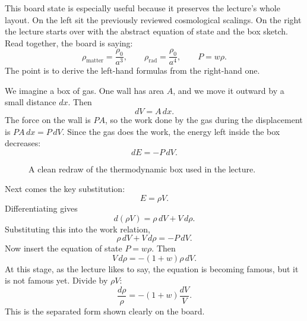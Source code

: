 This board state is especially useful because it preserves the lecture's whole layout. On the left sit the previously reviewed cosmological scalings. On the right the lecture starts over with the abstract equation of state and the box sketch. Read together, the board is saying:
\begin{equation}
\rho_{\text{matter}}=\frac{\rho_0}{a^3},
\qquad
\rho_{\text{rad}}=\frac{\rho_0}{a^4},
\qquad
P=w\rho.
\end{equation}
The point is to derive the left-hand formulas from the right-hand one.

We imagine a box of gas. One wall has area \(A\), and we move it outward by a small distance \(dx\). Then
\begin{equation}
dV=A\,dx.
\end{equation}
The force on the wall is \(PA\), so the work done by the gas during the displacement is \(PA\,dx=P\,dV\). Since the gas does the work, the energy left inside the box decreases:
\begin{equation}
dE=-P\,dV.
\end{equation}

\begin{figure}[h]
\centering
{}
\caption{A clean redraw of the thermodynamic box used in the lecture.}
\end{figure}

Next comes the key substitution:
\begin{equation}
E=\rho V.
\end{equation}
Differentiating gives
\begin{equation}
d(\rho V)=\rho\,dV+V\,d\rho.
\end{equation}
Substituting this into the work relation,
\begin{equation}
\rho\,dV+V\,d\rho=-P\,dV.
\end{equation}
Now insert the equation of state \(P=w\rho\). Then
\begin{equation}
V\,d\rho=-(1+w)\rho\,dV.
\end{equation}
At this stage, as the lecture likes to say, the equation is becoming famous, but it is not famous yet. Divide by \(\rho V\):
\begin{equation}
\frac{d\rho}{\rho}=-(1+w)\frac{dV}{V}.
\end{equation}
This is the separated form shown clearly on the board.

